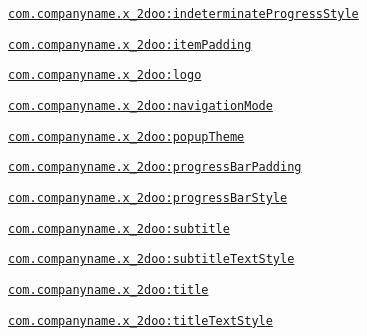 {\tt \hyperlink{classandroid_1_1support_1_1v4_1_1_r_1_1styleable_a8a88b78aad97f680e3cbee4dd08ef23}{com.companyname.x\_\-2doo:indeterminateProgressStyle}}

{\tt \hyperlink{classandroid_1_1support_1_1v4_1_1_r_1_1styleable_10e74e1d287a83eeaec631e4753a9d2f}{com.companyname.x\_\-2doo:itemPadding}}

{\tt \hyperlink{classandroid_1_1support_1_1v4_1_1_r_1_1styleable_239d55172c67152fbf4c566f3de2f586}{com.companyname.x\_\-2doo:logo}}

{\tt \hyperlink{classandroid_1_1support_1_1v4_1_1_r_1_1styleable_57771890bb08e78ec220a5ffac58bd77}{com.companyname.x\_\-2doo:navigationMode}}

{\tt \hyperlink{classandroid_1_1support_1_1v4_1_1_r_1_1styleable_fbc82042283d6f161c64d06b055e15dc}{com.companyname.x\_\-2doo:popupTheme}}

{\tt \hyperlink{classandroid_1_1support_1_1v4_1_1_r_1_1styleable_86bc83c8961f6605b5d3fa0a1ae7ec1c}{com.companyname.x\_\-2doo:progressBarPadding}}

{\tt \hyperlink{classandroid_1_1support_1_1v4_1_1_r_1_1styleable_4d02536c4a498848e9b2a9223f011d73}{com.companyname.x\_\-2doo:progressBarStyle}}

{\tt \hyperlink{classandroid_1_1support_1_1v4_1_1_r_1_1styleable_b13c54236519fed1addd3ca8eb816d6d}{com.companyname.x\_\-2doo:subtitle}}

{\tt \hyperlink{classandroid_1_1support_1_1v4_1_1_r_1_1styleable_8ebb80bb063e0a82480659b40929e291}{com.companyname.x\_\-2doo:subtitleTextStyle}}

{\tt \hyperlink{classandroid_1_1support_1_1v4_1_1_r_1_1styleable_71731b8a49f4eb22e29277c675a98927}{com.companyname.x\_\-2doo:title}}

{\tt \hyperlink{classandroid_1_1support_1_1v4_1_1_r_1_1styleable_6a25d0e26442974dff249844cf2955a8}{com.companyname.x\_\-2doo:titleTextStyle}}

